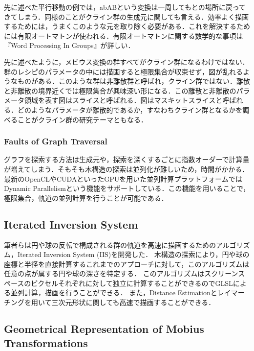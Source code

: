 先に述べた平行移動の例では，abABという変換は一周してもとの場所に戻ってきてしまう．同様のことがクライン群の生成元に関しても言える．効率よく描画するためには，うまくこのような元を取り除く必要がある．これを解決するためには有限オートマトンが使われる．有限オートマトンに関する数学的な事項は『Word Processing In Groups』\cite{wordProcessing}が詳しい．

先に述べたように，メビウス変換の群すべてがクライン群になるわけではない．群のレシピのパラメータの中には描画すると極限集合が収束せず，図が乱れるようなものがある．このような群は非離散群と呼ばれ，クライン群ではない．離散と非離散の境界近くでは極限集合が興味深い形になる．この離散と非離散のパラメータ領域を表す図はスライスと呼ばれる．図はマスキットスライスと呼ばれる．どのようなパラメータが離散的であるか，すなわちクライン群となるかを調べることがクライン群の研究テーマともなる．

\subsubsection{Faults of Graph Traversal}
グラフを探索する方法は生成元や，探索を深くするごとに指数オーダーで計算量が増えてしまう．そもそも木構造の探索は並列化が難しいため，時間がかかる．
最新のOpenCLやCUDAといったGPUを用いた並列計算プラットフォームではDynamic Parallelismという機能をサポートしている．この機能を用いることで，極限集合，軌道の並列計算を行うことが可能である．

\subsection{Iterated Inversion System}
筆者らは円や球の反転で構成される群の軌道を高速に描画するためのアルゴリズム，Iterated Inversion System (IIS)\cite{iis}を開発した．
木構造の探索により，円や球の座標と半径を直接計算するこれまでのアプローチに対して，このアルゴリズムは任意の点が属する円や球の深さを特定する．
このアルゴリズムはスクリーンスペースのピクセルそれぞれに対して独立に計算することができるのでGLSLによる並列計算，描画を行うことができる．
また，Distance Estimationとレイマーチングを用いて三次元形状に関しても高速で描画することができる．

\subsection{Geometrical Representation of Mobius Transformations}

